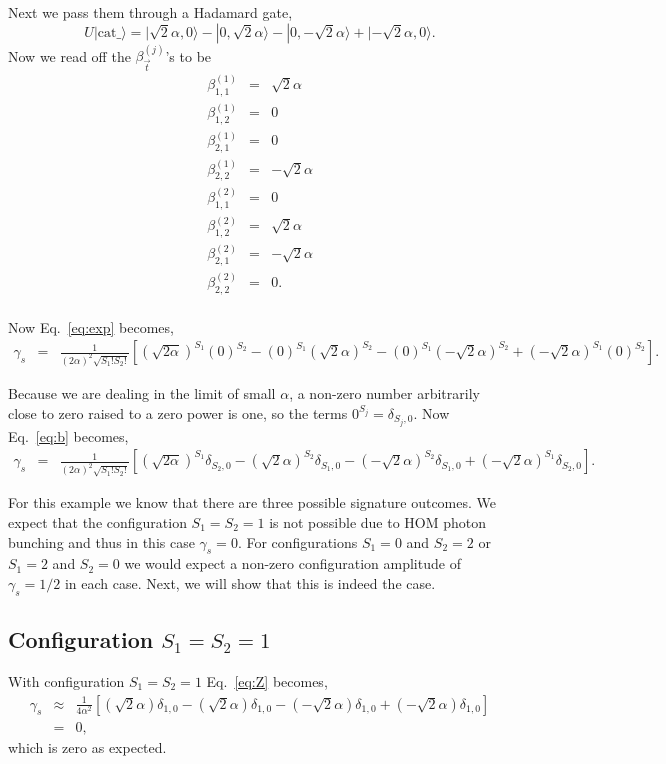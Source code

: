 \documentclass[aps,pra,singlecolumn,amsmath,amssymb,nofootinbib,superscriptaddress]{revtex4}
\newcommand{\ket}[1]{|#1\rangle}
\begin{document}
Next we pass them through a Hadamard gate,
\begin{equation}
U\ket{\mathrm{cat}\_}=\ket{\sqrt{2}\alpha,0}-\ket{0,\sqrt{2}\alpha}-\ket{0,-\sqrt{2}\alpha}+\ket{-\sqrt{2}\alpha,0}.
\end{equation}
Now we read off the $\beta_{\vec{t}}^{(j)}$'s to be
\begin{eqnarray}
\beta_{1,1}^{(1)}&=&\sqrt{2}\alpha \nonumber \\
\beta_{1,2}^{(1)}&=&0 \nonumber \\
\beta_{2,1}^{(1)}&=&0 \nonumber \\
\beta_{2,2}^{(1)}&=&-\sqrt{2}\alpha \nonumber \\
\beta_{1,1}^{(2)}&=&0 \nonumber \\
\beta_{1,2}^{(2)}&=&\sqrt{2}\alpha \nonumber \\
\beta_{2,1}^{(2)}&=&-\sqrt{2}\alpha \nonumber \\
\beta_{2,2}^{(2)}&=&0. \nonumber \\
\end{eqnarray}

Now Eq.~\ref{eq:exp} becomes,
\begin{eqnarray} \label{eq:b}
\gamma_s &=&  \frac{1}{(2\alpha)^2\sqrt{S_1!S_2!}} \left[
(\sqrt{2\alpha})^{S_1}(0)^{S_2}
-(0)^{S_1}(\sqrt{2}\alpha)^{S_2}
-(0)^{S_1}(-\sqrt{2}\alpha)^{S_2}
+(-\sqrt{2}\alpha)^{S_1}(0)^{S_2}
\right].
\end{eqnarray}

Because we are dealing in the limit of small $\alpha$, a non-zero number arbitrarily close to zero raised to a zero power is one, so the terms $0^{S_j}=\delta_{S_j,0}$. Now Eq.~\ref{eq:b} becomes,
\begin{eqnarray} \label{eq:Z}
\gamma_s &=&  \frac{1}{(2\alpha)^2\sqrt{S_1!S_2!}} \left[
(\sqrt{2\alpha})^{S_1}\delta_{S_2,0}
-(\sqrt{2}\alpha)^{S_2}\delta_{S_1,0}
-(-\sqrt{2}\alpha)^{S_2}\delta_{S_1,0}
+(-\sqrt{2}\alpha)^{S_1}\delta_{S_2,0}
\right].
\end{eqnarray}

For this example we know that there are three possible signature outcomes. We expect that the configuration $S_1=S_2=1$ is not possible due to HOM photon bunching and thus in this case $\gamma_s=0$. For configurations $S_1=0$ and $S_2=2$ or $S_1=2$ and $S_2=0$ we would expect a non-zero configuration amplitude of $\gamma_s=1/2$ in each case. Next, we will show that this is indeed the case. 
\subsection{Configuration $S_1=S_2=1$}
With configuration $S_1=S_2=1$ Eq.~\ref{eq:Z} becomes,
\begin{eqnarray}
\gamma_s &\approx& \frac{1}{4\alpha^2} \left[ 
(\sqrt{2}\alpha)\delta_{1,0}
-(\sqrt{2}\alpha)\delta_{1,0}
-(-\sqrt{2}\alpha)\delta_{1,0}
+(-\sqrt{2}\alpha)\delta_{1,0} \right] \nonumber \\
&=& 0,
\end{eqnarray}
which is zero as expected. 
\end{document}
